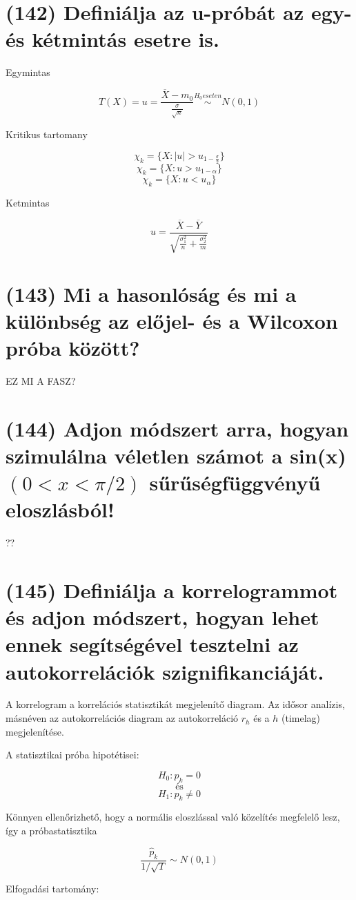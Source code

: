 \documentclass[12p]{article}
\begin{document}
\section{(142)  Definiálja az u-próbát az egy- és kétmintás esetre is.}

Egymintas

$$T(X) = u = \frac{\overline{X} - m_0}{\frac{\sigma}{\sqrt{n}}} \stackrel{H_0 eseten}{\sim} N(0, 1)$$

Kritikus tartomany

$$\chi_k = \{X: |u| > u_{1-\frac{\sigma}{2}}\}$$
$$\chi_k = \{X: u > u_{1-\alpha}\}$$
$$\chi_k = \{X: u < u_\alpha\}$$

Ketmintas

$$\displaystyle{u = \frac{\overline{X} - \overline{Y}}{\sqrt{\frac{\sigma_1^2}{n} + \frac{\sigma_2^2}{m}}}}$$

\section{(143) Mi a hasonlóság és mi a különbség az előjel- és a Wilcoxon próba között?}

EZ MI A FASZ?

\section{(144) Adjon módszert arra, hogyan szimulálna véletlen számot a sin(x) $(0 < x < \pi/2)$ sűrűségfüggvényű eloszlásból!}

??

\section{(145) Definiálja a korrelogrammot és adjon módszert, hogyan lehet ennek segítségével tesztelni
az autokorrelációk szignifikanciáját.}

A korrelogram a korrelációs statisztikát megjelenítő diagram. Az idősor analízis, másnéven az autokorrelációs diagram az autokorreláció $r_h$ és a $h$ (timelag) megjelenítése.

A statisztikai próba hipotétisei:

$$H_0 : p_k = 0$$
\[
	\text{és}
\]
$$H_1 : p_k \neq 0$$

Könnyen ellenőrizhető, hogy a normális eloszlással való közelítés megfelelő
lesz, így a próbastatisztika

$$\frac{\hat{p}_k}{1/\sqrt{T}} \sim N(0,1) $$

Elfogadási tartomány:
\end{document}
